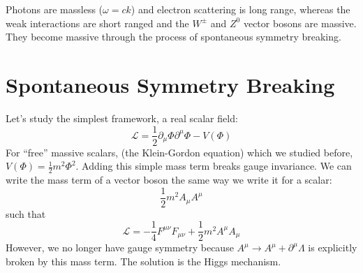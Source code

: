 \documentclass[a4paper,twoside,master.tex]{subfiles}
\begin{document}
Photons are massless ($ \omega = ck $) and electron scattering is long range, whereas the weak interactions are short ranged and the $ W^{\pm} $ and $ Z^0 $ vector bosons are massive. They become massive through the process of spontaneous symmetry breaking.

\section{Spontaneous Symmetry Breaking}\label{sec:spontaneous_symmetry_breaking}

Let's study the simplest framework, a real scalar field:
\begin{equation}
    \mathcal{L} = \frac{1}{2} \partial_{\mu} \Phi \partial^{\mu} \Phi - V(\Phi)
\end{equation}
For ``free'' massive scalars, (the Klein-Gordon equation) which we studied before, $ V(\Phi) = \frac{1}{2} m^2 \Phi^2 $. Adding this simple mass term breaks gauge invariance. We can write the mass term of a vector boson the same way we write it for a scalar:
\begin{equation}
    \frac{1}{2} m^2 A_{\mu} A^{\mu}
\end{equation}
such that
\begin{equation}
    \mathcal{L} = - \frac{1}{4} F^{\mu \nu} F_{\mu \nu} + \frac{1}{2} m^2 A^{\mu} A_{\mu}
\end{equation}
However, we no longer have gauge symmetry because $ A^{\mu} \to A^{\mu} + \partial^{\mu} \Lambda $ is explicitly broken by this mass term. The solution is the Higgs mechanism.
\end{document}
